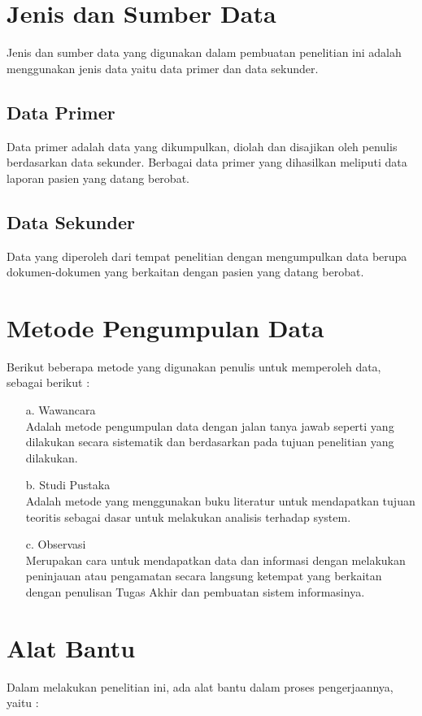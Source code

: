 \documentclass{jtetiproposalskripsi}
\begin{document}
\section{Jenis dan Sumber Data}
Jenis dan sumber data yang digunakan dalam pembuatan penelitian ini adalah menggunakan jenis data yaitu data primer dan data sekunder.

\subsection{Data Primer}
Data primer adalah data yang dikumpulkan, diolah dan disajikan oleh penulis berdasarkan data sekunder. Berbagai data primer yang dihasilkan meliputi data laporan pasien yang datang berobat.

\subsection{Data Sekunder}
Data yang diperoleh dari tempat penelitian dengan mengumpulkan data berupa dokumen-dokumen yang berkaitan dengan pasien yang datang berobat.

\section{Metode Pengumpulan Data}
Berikut beberapa metode yang digunakan penulis untuk memperoleh data, sebagai berikut :
\begin{itemize}

\item[a.]	Wawancara
 \\
 Adalah metode pengumpulan data dengan jalan tanya jawab seperti yang dilakukan secara sistematik dan berdasarkan pada tujuan penelitian yang dilakukan.
\item[b.]	Studi Pustaka
 \\
 Adalah metode yang menggunakan buku literatur untuk mendapatkan tujuan teoritis sebagai dasar untuk melakukan analisis terhadap system.
\item[c.]	Observasi
\\
Merupakan cara untuk mendapatkan data dan informasi dengan melakukan peninjauan atau pengamatan secara langsung ketempat yang berkaitan dengan penulisan Tugas Akhir dan pembuatan sistem informasinya.
\end{itemize}

\section{Alat Bantu}
Dalam melakukan penelitian ini, ada alat bantu dalam proses pengerjaannya, yaitu :
\end{document}
